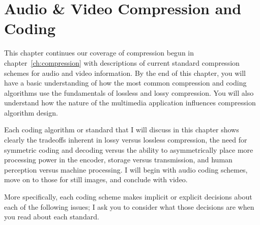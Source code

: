 
%
%
%
%

\chapter{Audio \& Video Compression and Coding}
\label{ch:audio-video}

This chapter continues our coverage of compression begun in
chapter~\ref{ch:compression} with descriptions of current standard
compression schemes for audio and video information.  By the end of
this chapter, you will have a basic understanding of how the most
common compression and coding algorithms use the fundamentals of
lossless and lossy compression. You will also understand how the
nature of the multimedia application influences compression algorithm
design.

Each coding algorithm or standard that I will discuss in this chapter
shows clearly the tradeoffs inherent in lossy versus lossless
compression, the need for symmetric coding and decoding versus the
ability to asymmetrically place more processing power in the encoder,
storage versus transmission, and human perception versus machine
processing. I will begin with audio coding schemes, move on to those
for still images, and conclude with video.

More specifically, each coding scheme makes implicit or explicit
decisions about each of the following issues; I ask you to consider
what those decisions are when you read about each standard.

